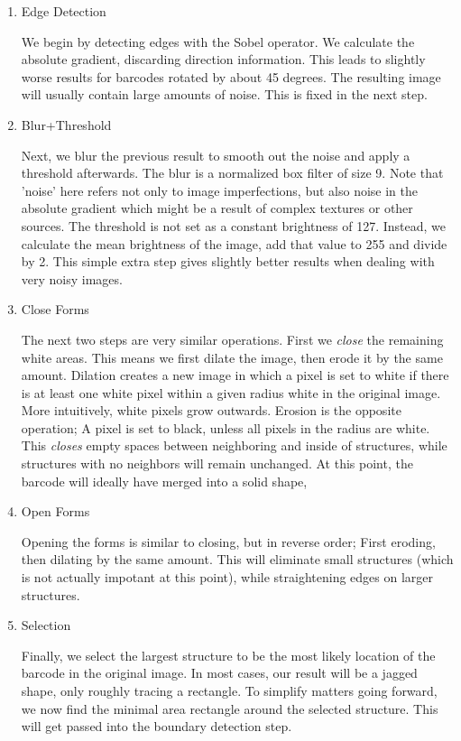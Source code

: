 \begin{enumerate}
	\item Edge Detection
	
	We begin by detecting edges with the Sobel operator. We calculate the absolute gradient, discarding direction information. This leads to slightly worse results for barcodes rotated by about 45 degrees. The resulting image will usually contain large amounts of noise. This is fixed in the next step. 

	\item Blur+Threshold
	
	Next, we blur the previous result to smooth out the noise and apply a threshold afterwards. The blur is a normalized box filter of size 9. Note that 'noise' here refers not only to image imperfections, but also noise in the absolute gradient which might be a result of complex textures or other sources. The threshold is not set as a constant brightness of 127. Instead, we calculate the mean brightness of the image, add that value to 255 and divide by 2. This simple extra step gives slightly better results when dealing with very noisy images.
	
	\item Close Forms
	
	The next two steps are very similar operations. First we \emph{close} the remaining white areas. This means we first dilate the image, then erode it by the same amount. Dilation creates a new image in which a pixel is set to white if there is at least one white pixel within a given radius white in the original image. More intuitively, white pixels grow outwards. Erosion is the opposite operation; A pixel is set to black, unless all pixels in the radius are white.  This \emph{closes} empty spaces between neighboring and inside of structures, while structures with no neighbors will remain unchanged. At this point, the barcode will ideally have merged into a solid shape, 
	
	\item Open Forms
	
	Opening the forms is similar to closing, but in reverse order; First eroding, then dilating by the same amount. This will eliminate small structures (which is not actually impotant at this point), while straightening edges on larger structures. 
	
	\item Selection
	
	Finally, we select the largest structure to be the most likely location of the barcode in the original image. In most cases, our result will be a jagged shape, only roughly tracing a rectangle. To simplify matters going forward, we now find the minimal area rectangle around the selected structure. This will get passed into the boundary detection step.
\end{enumerate}

